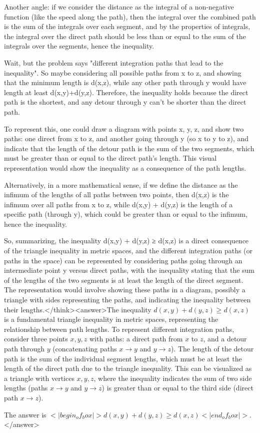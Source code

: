 Another angle: if we consider the distance as the integral of a non-negative function (like the speed along the path), then the integral over the combined path is the sum of the integrals over each segment, and by the properties of integrals, the integral over the direct path should be less than or equal to the sum of the integrals over the segments, hence the inequality.

Wait, but the problem says "different integration paths that lead to the inequality". So maybe considering all possible paths from x to z, and showing that the minimum length is d(x,z), while any other path through y would have length at least d(x,y)+d(y,z). Therefore, the inequality holds because the direct path is the shortest, and any detour through y can't be shorter than the direct path.

To represent this, one could draw a diagram with points x, y, z, and show two paths: one direct from x to z, and another going through y (so x to y to z), and indicate that the length of the detour path is the sum of the two segments, which must be greater than or equal to the direct path's length. This visual representation would show the inequality as a consequence of the path lengths.

Alternatively, in a more mathematical sense, if we define the distance as the infimum of the lengths of all paths between two points, then d(x,z) is the infimum over all paths from x to z, while d(x,y) + d(y,z) is the length of a specific path (through y), which could be greater than or equal to the infimum, hence the inequality.

So, summarizing, the inequality d(x,y) + d(y,z) ≥ d(x,z) is a direct consequence of the triangle inequality in metric spaces, and the different integration paths (or paths in the space) can be represented by considering paths going through an intermediate point y versus direct paths, with the inequality stating that the sum of the lengths of the two segments is at least the length of the direct segment. The representation would involve showing these paths in a diagram, possibly a triangle with sides representing the paths, and indicating the inequality between their lengths.</think><answer>The inequality \( d(x,y) + d(y,z) \geq d(x,z) \) is a fundamental triangle inequality in metric spaces, representing the relationship between path lengths. To represent different integration paths, consider three points \( x, y, z \) with paths: a direct path from \( x \) to \( z \), and a detour path through \( y \) (concatenating paths \( x \to y \) and \( y \to z \)). The length of the detour path is the sum of the individual segment lengths, which must be at least the length of the direct path due to the triangle inequality. This can be visualized as a triangle with vertices \( x, y, z \), where the inequality indicates the sum of two side lengths (paths \( x \to y \) and \( y \to z \)) is greater than or equal to the third side (direct path \( x \to z \)).  

The answer is \(<|begin_of_box|>d(x,y) + d(y,z) \geq d(x,z)<|end_of_box|>\).</answer>
